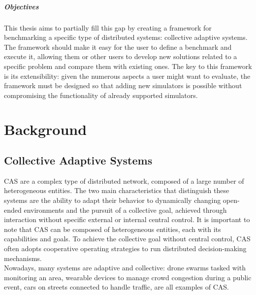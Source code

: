 \documentclass[12pt,a4paper,openright,twoside]{book}
\begin{document}
\paragraph{Objectives}

This thesis aims to partially fill this gap by creating a framework for benchmarking a specific type of distributed systems: collective adaptive systems. 
The framework should make it easy for the user to define a benchmark and execute it, 
allowing them or other users to develop new solutions related to a specific problem and compare them with existing ones. 
The key to this framework is its extensibility: given the numerous aspects a user might want to evaluate, 
the framework must be designed so that adding new simulators is possible without compromising the functionality of already supported simulators.

\chapter{Background}

\section{Collective Adaptive Systems}

\ac{CAS} are a complex type of distributed network, composed of a large number of heterogeneous entities.
The two main characteristics that distinguish these systems are the ability to adapt their behavior to dynamically changing open-ended environments
and the pursuit of a collective goal, achieved through interaction without specific external or internal central control. \cite{DBLP:series/lncs/HolzlRW08, DBLP:journals/corr/abs-1108-5643}
It is important to note that \ac{CAS} can be composed of heterogeneous entities, each with its capabilities and goals.
To achieve the collective goal without central control, \ac{CAS} often adopts cooperative operating strategies to run distributed decision-making mechanisms. \cite{DBLP:journals/tomacs/Aldini18} \\

Nowadays, many systems are adaptive and collective: drone swarms tasked with monitoring an area, 
wearable devices to manage crowd congestion during a public event, cars on streets connected to handle traffic, 
are all examples of CAS. \cite{DBLP:journals/sttt/NicolaJW20}
\end{document}
